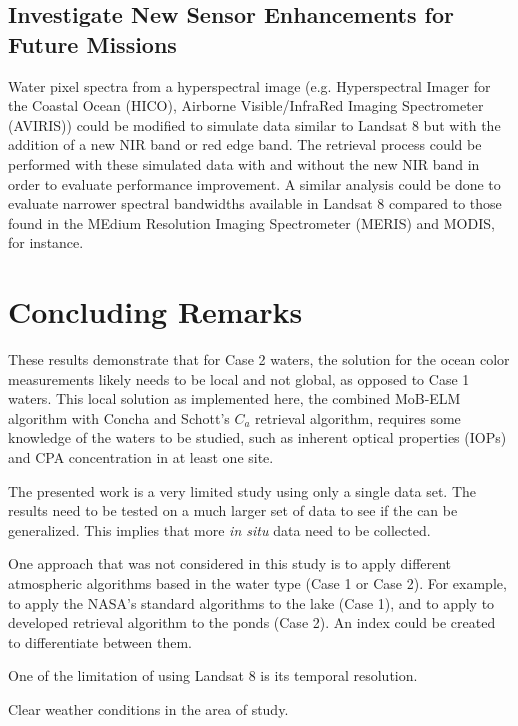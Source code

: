 \subsection{Investigate New Sensor Enhancements for Future Missions}
Water pixel spectra from a hyperspectral image (e.g. Hyperspectral Imager for the Coastal Ocean (HICO), Airborne Visible/InfraRed Imaging Spectrometer (AVIRIS)) could be modified to simulate data similar to Landsat 8 but with the addition of a new NIR band or red edge band. The retrieval process could be performed with these simulated data with and without the new NIR band in order to evaluate performance improvement. A similar analysis could be done to evaluate narrower spectral bandwidths available in Landsat 8 compared to those found in the MEdium Resolution Imaging Spectrometer (MERIS) and MODIS, for instance. 

\section{Concluding Remarks}

These results demonstrate that for Case 2 waters, the solution for the ocean color measurements likely needs to be local and not global, as opposed to Case 1 waters. This local solution as implemented here, the combined MoB-ELM algorithm with Concha and Schott's $C_a$ retrieval algorithm, requires some knowledge of the waters to be studied, such as inherent optical properties (IOPs) and CPA concentration in at least one site.

The presented work is a very limited study using only a single data set. The results need to be tested on a much larger set of data to see if the can be generalized. This implies that more {\it in situ} data need to be collected.

One approach that was not considered in this study is to apply different atmospheric algorithms based in the water type (Case 1 or Case 2). For example, to apply the NASA's standard algorithms to the lake (Case 1), and to apply to developed retrieval algorithm to the ponds (Case 2). An index could be created to differentiate between them.

One of the limitation of using Landsat 8 is its temporal resolution.

Clear weather conditions in the area of study.

